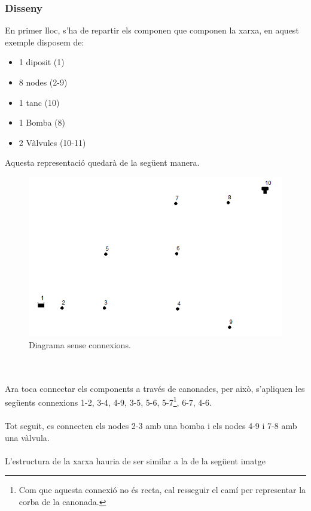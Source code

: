 \documentclass[12pt]{article}
\begin{document}
\subsubsection{Disseny}
En primer lloc, s'ha de repartir els componen que componen la xarxa, en aquest exemple disposem de:
\begin{itemize}
	\item 1 diposit (1)
	\item 8 nodes (2-9)
	\item 1 tanc (10)
	\item 1 Bomba (8)
	\item 2 Vàlvules (10-11)
\end{itemize}
Aquesta representació quedarà de la següent manera.
\begin{figure}[h!]
	\centering
	\includegraphics[scale=.7]{imatges/epanet/5.png}
	\caption{Diagrama sense connexions.}
\end{figure}
\\\\Ara toca connectar els components a través de canonades, per això, s'apliquen les següents connexions 1-2, 3-4, 4-9, 3-5, 5-6, 5-7\footnote{Com que aquesta connexió no és recta, cal resseguir el camí per representar la corba de la canonada.}, 6-7, 4-6. 
\\\\Tot seguit, es connecten els nodes 2-3 amb una bomba i els nodes 4-9 i 7-8 amb una vàlvula.
\\\\L'estructura de la xarxa hauria de ser similar a la de la següent imatge
\pagebreak
\end{document}
